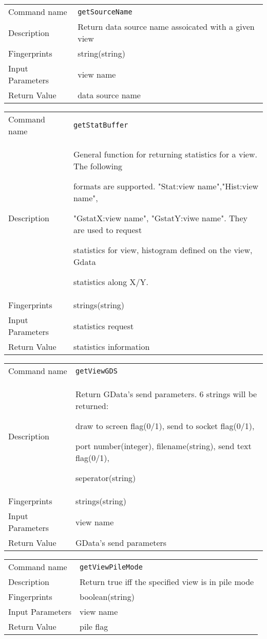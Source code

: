 \noindent
\begin{tabular}{l|p{5in}}
\hline
Command name &{\tt getSourceName }\\ 
Description &
Return data source name assoicated with a given view
 	\\
Fingerprints & string(string)\\
Input Parameters&view name\\
Return Value&data source name\\
\hline
\end{tabular}
\bigskip

\noindent
\begin{tabular}{l|p{5in}}
\hline
Command name &{\tt getStatBuffer }\\ 
Description &
General function for returning statistics for a view. The following 
 
formats are supported. "Stat:view name","Hist:view name", 
 
"GstatX:view name", "GstatY:viwe name". They are used to request 
 
statistics for view, histogram defined on the view, Gdata 
 
statistics along X/Y.
 	\\
Fingerprints & strings(string)\\
Input Parameters&statistics request\\
Return Value&statistics information\\
\hline
\end{tabular}
\bigskip

\noindent
\begin{tabular}{l|p{5in}}
\hline
Command name &{\tt getViewGDS }\\ 
Description &
Return GData's send parameters. 6 strings will be returned:
 
draw to screen flag(0/1), send to socket flag(0/1), 
 
port number(integer), filename(string), send text flag(0/1), 
 
seperator(string)
 	\\
Fingerprints & strings(string)\\
Input Parameters&view name\\
Return Value&GData's send parameters\\
\hline
\end{tabular}
\bigskip

\noindent
\begin{tabular}{l|p{5in}}
\hline
Command name &{\tt getViewPileMode }\\ 
Description &
Return true iff the specified view is in pile mode
 	\\
Fingerprints & boolean(string)\\
Input Parameters&view name\\
Return Value&pile flag\\
\hline
\end{tabular}
\bigskip

